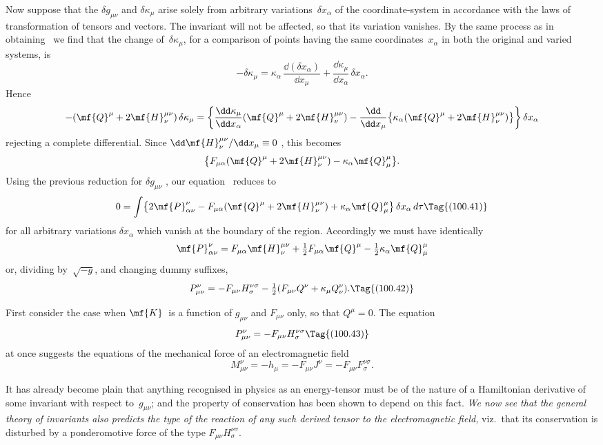 \documentclass[12pt]{book}
\begin{document}
Now suppose that the $\delta g_{\mu\nu}$ and $\delta\kappa_{\mu}$ arise solely from arbitrary variations~$\delta x_{\alpha}$
of the coordinate\hyp{}system in accordance with the laws of transformation
of tensors and vectors. The invariant will not be affected, so that its variation
vanishes. By the same process as in obtaining~ we find that the change
of~$\delta\kappa_{\mu}$, for a comparison of points having the same coordinates~$x_{\alpha}$ in both the
original and varied systems, is
\[
-\delta\kappa_{\mu}
= \kappa_{\alpha}\, \frac{\dd(\delta x_{\alpha})}{\dd x_{\mu}}
+ \frac{\dd\kappa_{\mu}}{\dd x_{\alpha}}\, \delta x_{\alpha}.
\]
Hence
\[
-(\mf{Q}^{\mu} + 2\mf{H}_{\nu}^{\mu\nu})\, \delta\kappa_{\mu}
= \left\{\frac{\dd\kappa_{\mu}}{\dd x_{\alpha}} (\mf{Q}^{\mu} + 2\mf{H}_{\nu}^{\mu\nu})
- \frac{\dd}{\dd x_{\mu}} \bigl\{\kappa_{\alpha} (\mf{Q}^{\mu} + 2\mf{H}_{\nu}^{\mu\nu})\bigr\}\right\} \delta x_{\alpha}
\]
rejecting a complete differential. Since $\dd\mf{H}_{\nu}^{\mu\nu}/\dd x_{\mu} \equiv 0$ , this becomes
\[
\bigl\{F_{\mu\alpha} (\mf{Q}^{\mu} + 2\mf{H}_{\nu}^{\mu\nu}) - \kappa_{\alpha} \mf{Q}_{\mu}^{\mu}\bigr\}.
\]
Using the previous reduction for $\delta g_{\mu\nu}$ , our equation~ reduces to
\[
0 = \int \bigl\{2 \mf{P}_{\alpha\nu}^{\nu}
- F_{\mu\alpha} (\mf{Q}^{\mu} + 2\mf{H}_{\nu}^{\mu\nu})
+ \kappa_{\alpha} \mf{Q}_{\mu}^{\mu}\bigr\}\, \delta x_{\alpha}\, d\tau
\Tag{(100.41)}
\]
for all arbitrary variations $\delta x_{\alpha}$ which vanish at the boundary of the region.
Accordingly we must have identically
\[
\mf{P}_{\alpha\nu}^{\nu}
= F_{\mu\alpha} \mf{H}_{\nu}^{\mu\nu}
+ \tfrac{1}{2} F_{\mu\alpha} \mf{Q}^{\mu}
- \tfrac{1}{2} \kappa_{\alpha} \mf{Q}_{\mu}^{\mu}
\]
or, dividing by~$\sqrt{-g}$, and changing dummy suffixes,
\[
P_{\mu\nu}^{\nu}
= -F_{\mu\nu} H_{\sigma}^{\nu\sigma}
- \tfrac{1}{2} (F_{\mu\nu} Q^{\nu} + \kappa_{\mu} Q_{\nu}^{\nu}).
\Tag{(100.42)}
\]

First consider the case when $\mf{K}$~is a function of $g_{\mu\nu}$ and $F_{\mu\nu}$ only, so that
$Q^{\mu} = 0$. The equation
\[
P_{\mu\nu}^{\nu} = -F_{\mu\nu} H_{\sigma}^{\nu\sigma}
\Tag{(100.43)}
\]
at once suggests the equations of the mechanical force of an electromagnetic
%
%
field
\[
M_{\mu\nu}^{\nu} = -h_{\mu} = -F_{\mu\nu} J^{\nu} = -F_{\mu\nu} F_{\sigma}^{\nu\sigma}.
\]

It has already become plain that anything recognised in physics as an
energy\hyp{}tensor must be of the nature of a Hamiltonian derivative of some
invariant with respect to~$g_{\mu\nu}$; and the property of conservation has been
shown to depend on this fact. \emph{We now see that the general theory of invariants
also predicts the type of the reaction of any such derived tensor to the
electromagnetic field,} viz.\ that its conservation is disturbed by a ponderomotive
force of the type $F_{\mu\nu} H_{\sigma}^{\nu\sigma}$.
%
\end{document}
